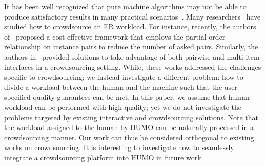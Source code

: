    It has been well recognized that pure machine algorithms may not be able to produce satisfactory results in many practical scenarios~\cite{li2016crowdsourced}. Many researchers~\cite{wang2012crowder, whang2013question, vesdapunt2014crowdsourcing, gokhale2014corleone, mozafari2014scaling, wang2015crowd, chai2016cost, verroios2017waldo} have studied how to crowdsource an ER workload. For instance, recently, the authors of~\cite{chai2016cost} proposed a cost-effective framework that employs the partial order relationship on instance pairs to reduce the number of asked pairs. Similarly, the authors in~\cite{verroios2017waldo} provided solutions to take advantage of both pairwise and multi-item interfaces in a crowdsourcing setting. While, these works addressed the challenges specific to crowdsourcing; we instead investigate a different problem: how to divide a workload between the human and the machine such that the user-specified quality guarantees can be met. In this paper, we assume that human workload can be performed with high quality; yet we do not investigate the problems targeted by existing interactive and crowdsourcing solutions. Note that the workload assigned to the human by HUMO can be naturally processed in a crowdsourcing manner. Our work can thus be considered orthogonal to existing works on crowdsourcing. It is interesting to investigate how to seamlessly integrate a crowdsourcing platform into HUMO in future work.

